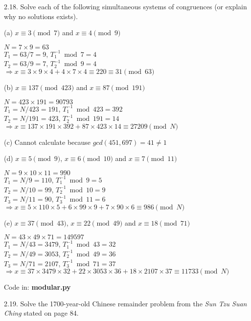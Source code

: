 2.18. Solve each of the following simultaneous systems of congruences (or explain why no solutions exists).

(a) $x \equiv 3 \pmod 7$ and $x \equiv 4 \pmod 9$
    
    $N=7 \times 9=63$ \\ $T_1=63/7=9$, $T_1^{-1} \bmod 7 = 4$ \\ $T_2=63/9=7$, $T_2^{-1} \bmod 9 = 4$ \\ $\Rightarrow x \equiv 3 \times 9 \times 4 + 4 \times 7 \times 4 \equiv 220 \equiv 31 \pmod {63}$
    
(b) $x \equiv 137 \pmod {423}$ and $x \equiv 87 \pmod {191}$
    
    $N=423 \times 191=90793$ \\ $T_1=N/423=191$, $T_1^{-1} \bmod 423 = 392$ \\ $T_2=N/191=423$, $T_2^{-1} \bmod 191 = 14$ \\ $\Rightarrow x \equiv 137 \times 191 \times 392 + 87 \times 423 \times 14 \equiv 27209 \pmod N$
    
(c) Cannot calculate because $gcd(451, 697)=41 \neq 1$
    
(d) $x \equiv 5 \pmod 9$, $x \equiv 6 \pmod {10}$ and $x \equiv 7 \pmod {11}$
    
    $N=9 \times 10 \times 11 = 990$ \\ $T_1=N/9=110$, $T_1^{-1} \bmod 9 = 5$ \\ $T_2=N/10=99$, $T_2^{-1} \bmod 10=9$ \\ $T_3=N/11=90$, $T_3^{-1} \bmod 11 = 6$ \\ $\Rightarrow x \equiv 5 \times 110 \times 5 + 6 \times 99 \times 9 + 7 \times 90 \times 6 \equiv 986 \pmod N$
    
(e) $x \equiv 37 \pmod {43}$, $x \equiv 22 \pmod {49}$ and $x \equiv 18 \pmod {71}$
    
    $N=43 \times 49 \times 71=149597$ \\ $T_1=N/43=3479$, $T_1^{-1} \bmod 43 = 32$ \\ $T_2=N/49=3053$, $T_2^{-1} \bmod 49=36$ \\ $T_3=N/71=2107$, $T_3^{-1} \bmod 71 = 37$ \\ $\Rightarrow x \equiv 37 \times 3479 \times 32 + 22 \times 3053 \times 36 + 18  \times 2107 \times 37 \equiv 11733 \pmod N$

Code in: \textbf{modular.py}

2.19. Solve the 1700-year-old Chinese remainder problem from the \textit{Sun Tzu Suan Ching} stated on page 84.

